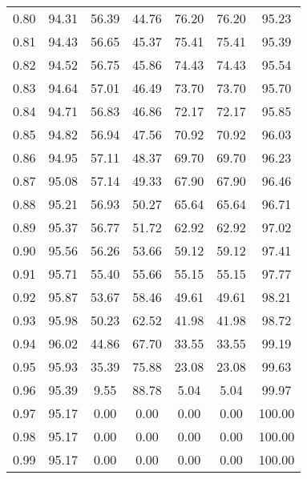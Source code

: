 \begin{tabular}{|c|c|c|c|c|c|c|}
      0.80 &     94.31 &     56.39 &      44.76 &   76.20 &      76.20 &         95.23 \\
      0.81 &     94.43 &     56.65 &      45.37 &   75.41 &      75.41 &         95.39 \\
      0.82 &     94.52 &     56.75 &      45.86 &   74.43 &      74.43 &         95.54 \\
      0.83 &     94.64 &     57.01 &      46.49 &   73.70 &      73.70 &         95.70 \\
      0.84 &     94.71 &     56.83 &      46.86 &   72.17 &      72.17 &         95.85 \\
      0.85 &     94.82 &     56.94 &      47.56 &   70.92 &      70.92 &         96.03 \\
      0.86 &     94.95 &     57.11 &      48.37 &   69.70 &      69.70 &         96.23 \\
      0.87 &     95.08 &     57.14 &      49.33 &   67.90 &      67.90 &         96.46 \\
      0.88 &     95.21 &     56.93 &      50.27 &   65.64 &      65.64 &         96.71 \\
      0.89 &     95.37 &     56.77 &      51.72 &   62.92 &      62.92 &         97.02 \\
      0.90 &     95.56 &     56.26 &      53.66 &   59.12 &      59.12 &         97.41 \\
      0.91 &     95.71 &     55.40 &      55.66 &   55.15 &      55.15 &         97.77 \\
      0.92 &     95.87 &     53.67 &      58.46 &   49.61 &      49.61 &         98.21 \\
      0.93 &     95.98 &     50.23 &      62.52 &   41.98 &      41.98 &         98.72 \\
      0.94 &     96.02 &     44.86 &      67.70 &   33.55 &      33.55 &         99.19 \\
      0.95 &     95.93 &     35.39 &      75.88 &   23.08 &      23.08 &         99.63 \\
      0.96 &     95.39 &      9.55 &      88.78 &    5.04 &       5.04 &         99.97 \\
      0.97 &     95.17 &      0.00 &       0.00 &    0.00 &       0.00 &        100.00 \\
      0.98 &     95.17 &      0.00 &       0.00 &    0.00 &       0.00 &        100.00 \\
      0.99 &     95.17 &      0.00 &       0.00 &    0.00 &       0.00 &        100.00 \\
\bottomrule
\end{tabular}
